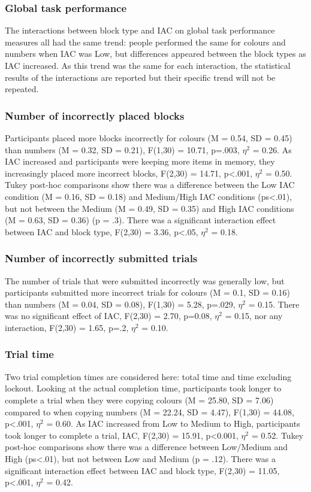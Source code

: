 \documentclass[11pt,oneside]{report}
\begin{document}
\begin{table}
\subsubsection{Global task performance}
The interactions between block type and IAC on global task performance measures all had the same trend: people performed the same for colours and numbers when IAC was Low, but differences appeared between the block types as IAC increased. As this trend was the same for each interaction, the statistical results of the interactions are reported but their specific trend will not be repeated.

\subsubsection{Number of incorrectly placed blocks}
Participants placed more blocks incorrectly for colours (M = 0.54, SD = 0.45) than numbers (M = 0.32, SD = 0.21), F(1,30) = 10.71, p=.003, $\eta^2$ = 0.26. As IAC increased and participants were keeping more items in memory, they increasingly placed more incorrect blocks, F(2,30) = 14.71, p<.001, $\eta^2$ = 0.50. Tukey post-hoc comparisons show there was a difference between the Low IAC condition (M = 0.16, SD = 0.18) and Medium/High IAC conditions (ps<.01), but not between the Medium (M = 0.49, SD = 0.35) and High IAC conditions (M = 0.63, SD = 0.36) (p = .3). There was a significant interaction effect between IAC and block type, F(2,30) = 3.36, p<.05, $\eta^2$ = 0.18.

\subsubsection{Number of incorrectly submitted trials}
The number of trials that were submitted incorrectly was generally low, but participants submitted more incorrect trials for colours (M = 0.1, SD = 0.16) than numbers (M = 0.04, SD = 0.08), F(1,30) = 5.28, p=.029, $\eta^2$ = 0.15. There was no significant effect of IAC, F(2,30) = 2.70, p=0.08, $\eta^2$ = 0.15, nor any interaction, F(2,30) = 1.65, p=.2, $\eta^2$ = 0.10.

\subsubsection{Trial time}
Two trial completion times are considered here: total time and time excluding lockout. 
Looking at the actual completion time, participants took longer to complete a trial when they were copying colours (M = 25.80, SD = 7.06) compared to when copying numbers (M = 22.24, SD = 4.47), F(1,30) = 44.08, p<.001, $\eta^2$ = 0.60. As IAC increased from Low to Medium to High, participants took longer to complete a trial, IAC, F(2,30) = 15.91, p<0.001, $\eta^2$ = 0.52. Tukey post-hoc comparisons show there was a difference between Low/Medium and High (ps<.01), but not between Low and Medium (p = .12). There was a significant interaction effect between IAC and block type, F(2,30) = 11.05, p<.001, $\eta^2$ = 0.42. 


\end{table}
\end{document}
